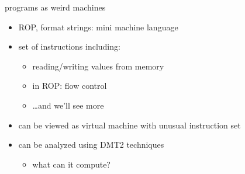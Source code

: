 \begin{frame}{programs as weird machines}
    \begin{itemize}
    \item ROP, format strings: mini machine language
    \item set of instructions including:
        \begin{itemize}
        \item reading/writing values from memory
        \item in ROP: flow control
        \item \ldots and we'll see more
        \end{itemize}
    \item can be viewed as virtual machine with unusual instruction set
    \vspace{.5cm}
    \item can be analyzed using DMT2 techniques
        \begin{itemize}
        \item what can it compute?
        \end{itemize}
    \end{itemize}
\end{frame}
